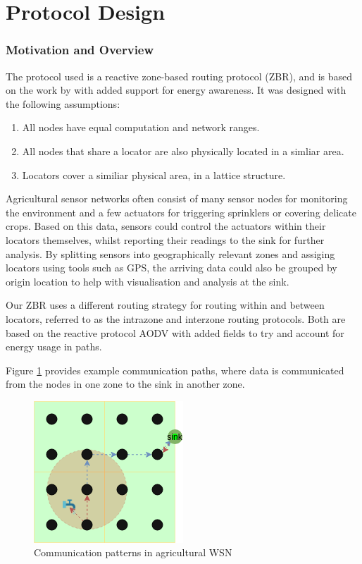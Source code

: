\documentclass[12pt]{article}
\begin{document}
\pagebreak
\part{Protocol Design} \label{protodesign}

\section{Motivation and Overview}

The protocol used is a reactive zone-based routing protocol (ZBR), and is based on the work by \cite{zbrp} with added support for energy awareness. It was designed with the following assumptions:

\begin{enumerate}
	\item All nodes have equal computation and network ranges.
	\item All nodes that share a locator are also physically located in a simliar area.
	\item Locators cover a similiar physical area, in a lattice structure.
\end{enumerate}


Agricultural sensor networks often consist of many sensor nodes for monitoring the environment and a few actuators for triggering sprinklers or covering delicate crops. Based on this data, sensors could control the actuators within their locators themselves, whilst reporting their readings to the sink for further analysis. By splitting sensors into geographically relevant zones and assiging locators using tools such as GPS, the arriving data could also be grouped by origin location to help with visualisation and analysis at the sink. 

Our ZBR uses a different routing strategy for routing within and between locators, referred to as the intrazone and interzone routing protocols. Both are based on the reactive protocol AODV with added fields to try and account for energy usage in paths. 

Figure \ref{fig:actuate} provides example communication paths, where data is communicated from the nodes in one zone to the sink in another zone.

\begin{figure}[!ht]
	\centering
	\includegraphics[width=0.5\linewidth]{images/actuate}
	\caption{Communication patterns in agricultural WSN}
	\label{fig:actuate}
\end{figure}
\end{document}
